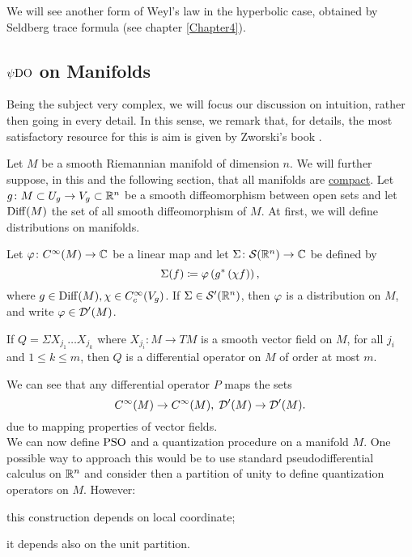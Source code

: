 We will see another form of Weyl's law in the hyperbolic case, obtained by Seldberg trace formula (see chapter \ref{Chapter4}).





\subsection{$\operatorname{\psi DO}$ on Manifolds}

Being the subject very complex, we will focus our discussion on intuition, rather then going in every detail. In this sense, we remark that, for details, the most satisfactory resource for this is aim is given by Zworski's book \cite{Zworski:semic}.


Let $M$ be a smooth Riemannian manifold of dimension $n$. We will further suppose, in this and the following section, that all manifolds are \underline{compact}. Let $g\colon M\subset U_{g}\to V_{g}\subset\mathbb{R}^{n}$ be a smooth diffeomorphism between open sets and let $\operatorname{Diff}(M)$ the set of all smooth diffeomorphism of $M$. At first, we will define distributions on manifolds.

\begin{defin}
\label{def:distr_on_manifold}
Let $\varphi\colon C^{\infty}(M)\to\mathbb{C}$ be a linear map and let $\Sigma\colon\mathcal{S}(\mathbb{R}^{n})\to\mathbb{C}$ be defined by
\[
\Sigma(f)\coloneqq\varphi\left(
g^{\ast}\left(\chi f\right)
\right),
\]
where $g\in\operatorname{Diff}(M),\chi\in C_{c}^{\infty}(V_{g})$. If $\Sigma\in\mathcal{S}'(\mathbb{R}^{n})$, then $\varphi$ is a distribution on $M$, and write $\varphi\in\operatorname{\mathcal{D}}'(M)$.
\end{defin}



\begin{defin}
\label{def:diff_oper_on_manifold} 
If $Q=\Sigma X_{j_{1}}\ldots X_{j_{k}}$ where $X_{j_{i}}\colon M\to TM$ is a smooth vector field on $M$, for all $j_{i}$ and $1\leq k\leq m$, then $Q$ is a differential operator on $M$ of order at most $m$.
\end{defin}

We can see that any differential operator $P$ maps the sets
\[
C^{\infty}(M)\to C^{\infty}(M),\;\operatorname{\mathcal{D}}'(M)\to\operatorname{\mathcal{D}}'(M).
\]
due to mapping properties of vector fields.\\
We can now define $\operatorname{PSO}$ and a quantization procedure on a manifold $M$. One possible way to approach this would be to use standard pseudodifferential calculus on $\mathbb{R}^{n}$ and consider then a partition of unity to define quantization operators on $M$. However:
\begin{compactitem}
\item this construction depends on local coordinate;
\item it depends also on the unit partition.
\end{compactitem}

